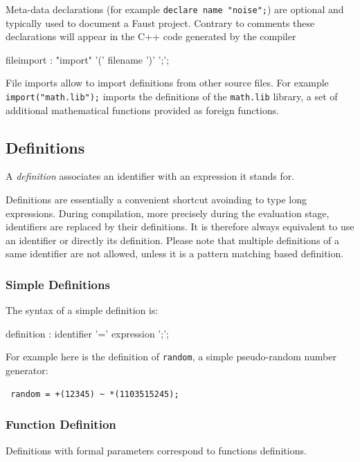 \documentclass{article}
\begin{document}
Meta-data declarations (for example \lstinline{declare name "noise";}) are optional and typically used to document a Faust project. Contrary to comments these declarations will appear in the C++ code generated by the compiler 

\begin{rail}
fileimport : "import" '(' filename ')' ';';
\end{rail}

File imports allow to import definitions from other source files.  
For example \lstinline{import("math.lib");} imports the definitions of the \lstinline{math.lib} library, a set of additional mathematical functions provided as foreign functions.

\subsection{Definitions}
A \textit{definition} associates an identifier with an expression it stands for. 

Definitions are essentially a convenient shortcut avoinding to type long expressions. During compilation, more precisely during the evaluation stage, identifiers are replaced by their definitions. It is therefore always equivalent to use an identifier or directly its definition. Please note that multiple definitions of a same identifier are not allowed, unless it is a pattern matching based definition.

\subsubsection{Simple Definitions}

The syntax of a simple definition is:

\begin{rail}
definition  : identifier '=' expression ';';
\end{rail} 

For example here is the definition of \lstinline'random', a simple pseudo-random number generator:

\begin{lstlisting}
 random = +(12345) ~ *(1103515245);
\end{lstlisting}


\subsubsection{Function Definition}

Definitions with formal parameters correspond to functions definitions.
\end{document}
